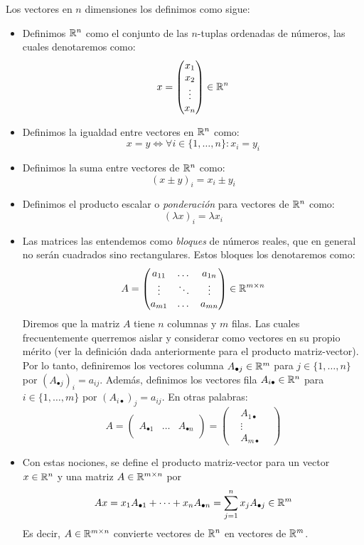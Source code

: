 \begin{definition}
Los vectores en $n$ dimensiones los definimos como sigue:
\begin{itemize}
\item Definimos $\mathbb{R}^n$ como el conjunto de las $n$-tuplas ordenadas de números, las cuales denotaremos como:
$$ x = \begin{pmatrix} x_1 \\ x_2 \\ \vdots \\ x_n \end{pmatrix} \in  \mathbb{R}^n$$
\item Definimos la igualdad entre vectores en $\mathbb{R}^n$ como:
$$ x = y \iff  \forall i \in \{1, \dots, n\}: x_i = y_i $$
\item Definimos la suma entre vectores de $\mathbb{R}^n$ como:
$$ (x \pm y)_i = x_i \pm y_i $$
\item Definimos el producto escalar o \textit{ponderación} para vectores de $\mathbb{R}^n$ como:
$$ (\lambda x)_i = \lambda x_i $$
\item Las matrices las entendemos como \textit{bloques} de números reales, que en general no serán cuadrados sino rectangulares. Estos bloques los denotaremos como:
$$ A = \begin{pmatrix} a_{11} & \dots & a_{1n} \\ \vdots & \ddots & \vdots \\ a_{m1} & \dots & a_{mn} \end{pmatrix} \in  \mathbb{R}^{m \times n} $$
Diremos que la matriz $A$ tiene $n$ columnas y $m$ filas. Las cuales frecuentemente querremos aislar y considerar como vectores en su propio mérito (ver la definición dada anteriormente para el producto matriz-vector). Por lo tanto, definiremos los vectores columna $A_{\bullet j} \in  \mathbb{R}^m$ para $j \in \{1, \dots, n\}$ por $(A_{\bullet j})_i = a_{ij}$. Además, definimos los vectores fila $A_{i \bullet} \in  \mathbb{R}^n$ para $i \in \{1, \dots, m\}$ por $(A_{i \bullet})_j = a_{ij}$. En otras palabras:
$$ A = \begin{pmatrix} & & \\ A_{\bullet  1} & \dots & A_{\bullet n} \\ & & \end{pmatrix} = \begin{pmatrix} & A_{1  \bullet} & \\ & \vdots & \\ & A_{m \bullet} & \end{pmatrix} $$
\item Con estas nociones, se define el producto matriz-vector para un vector $x \in  \mathbb{R}^n$ y una matriz $A \in  \mathbb{R}^{m \times n}$ por
$$ Ax = x_1 A_{\bullet  1} + \dots + x_n A_{\bullet n} = \sum_{j = 1}^n x_j A_{\bullet j} \in  \mathbb{R}^m$$
Es decir, $A \in  \mathbb{R}^{m \times n}$ convierte vectores de $\mathbb{R}^n$ en vectores de $\mathbb{R}^m$.
\end{itemize}

\end{definition}

